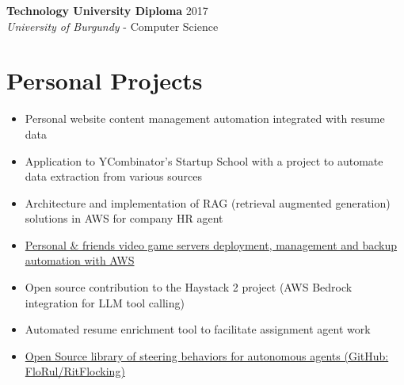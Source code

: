 ﻿\documentclass[11pt,letterpaper]{article}
\begin{document}
\textbf{Technology University Diploma} \hfill 2017\\
\textit{University of Burgundy} - Computer Science

\section*{Personal Projects}
\begin{itemize}
\item Personal website content management automation integrated with resume data
\item Application to YCombinator's Startup School with a project to automate data extraction from various sources
\item Architecture and implementation of RAG (retrieval augmented generation) solutions in AWS for company HR agent
\item \href{https://github.com/FloRul/Satiserver}{Personal \& friends video game servers deployment, management and backup automation with AWS}
\item Open source contribution to the Haystack 2 project (AWS Bedrock integration for LLM tool calling)
\item Automated resume enrichment tool to facilitate assignment agent work
\item \href{https://github.com/FloRul/RitFlocking}{Open Source library of steering behaviors for autonomous agents (GitHub: FloRul/RitFlocking)}
\end{itemize}
\end{document}
